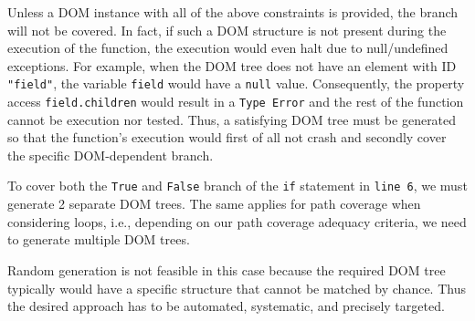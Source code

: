 Unless a DOM instance with all of the above constraints is provided, the  branch will not be covered. In fact, if such a DOM structure is not present during the execution of the function, the execution would even halt due to null/undefined exceptions. For example, when the DOM tree does not have an element with ID {\tt "field"}, the variable {\tt field} would have a {\tt null} value. Consequently, the property access {\tt field.children} would result in a {\tt Type Error} and the rest of the function cannot be execution  nor tested. Thus, a satisfying DOM tree must be generated so that the function's execution would first of all not crash and secondly cover the specific DOM-dependent branch.

To cover both the {\tt True} and {\tt False} branch of the {\tt if} statement in {\tt line 6}, we must generate 2 separate DOM trees.  %
The same applies for path coverage when considering loops, i.e., depending on our path coverage adequacy criteria, we need to generate multiple DOM trees.


Random generation is not feasible in this case because the required DOM tree typically would have a specific structure that cannot be matched by chance. Thus the desired approach has to be automated, systematic, and precisely targeted.

